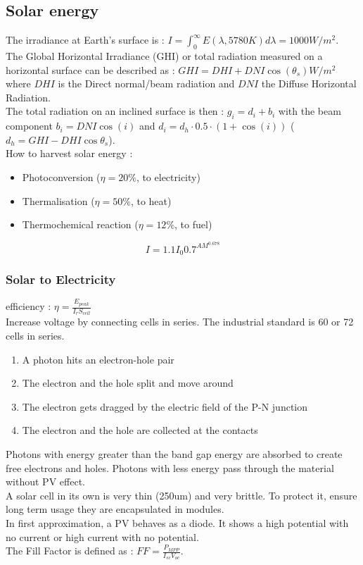\documentclass[../main.tex]{subfiles}
\begin{document}
\subsection{Solar energy}
The irradiance at Earth's surface is : $I = \int_0^\infty E(\lambda, 5780K) d\lambda = 1000 W/m^2$.\\
The Global Horizontal Irradiance (GHI) or total radiation measured on a horizontal surface can be described as : $GHI = DHI + DNI \cos(\theta_s) W/m^2$ where $DHI$ is the Direct normal/beam radiation and $DNI$ the Diffuse Horizontal Radiation.\\
The total radiation on an inclined surface is then : $g_i = d_i+b_i$ with the beam component $b_i = DNI \cos(i)$ and $d_i = d_h \cdot 0.5 \cdot (1+\cos(i))$ ($d_h = GHI-DHI\cos\theta_s$).\\
How to harvest solar energy : \begin{itemize}
    \item Photoconversion ($\eta = 20\%$, to electricity)
    \item Thermalisation ($\eta = 50\%$, to heat)
    \item Thermochemical reaction ($\eta = 12\%$, to fuel)
\end{itemize}

\begin{equation}
    I = 1.1 I_0 0.7^{AM^{0.678}}
\end{equation}


\subsubsection{Solar to Electricity}

efficiency : $\eta = \frac{E_{peak}}{I_r S_{cell}}$\\
Increase voltage by connecting cells in series. The industrial standard is 60 or 72 cells in series.\\
\begin{enumerate}
    \item A photon hits an electron-hole pair
    \item The electron and the hole split and move around
    \item The electron gets dragged by the electric field of the P-N junction
    \item The electron and the hole are collected at the contacts
\end{enumerate}
Photons with energy greater than the band gap energy are absorbed to create free electrons and holes. Photons with less energy pass through the material without PV effect.\\
A solar cell in its own is very thin (250um) and very brittle. To protect it, ensure long term usage they are encapsulated in modules.\\
In first approximation, a PV behaves as a diode. It shows a high potential with no current or high current with no potential.\\
The Fill Factor is defined as : $FF = \frac{P_{MPP}}{I_{sc} V_{oc}}$. \\
\end{document}
